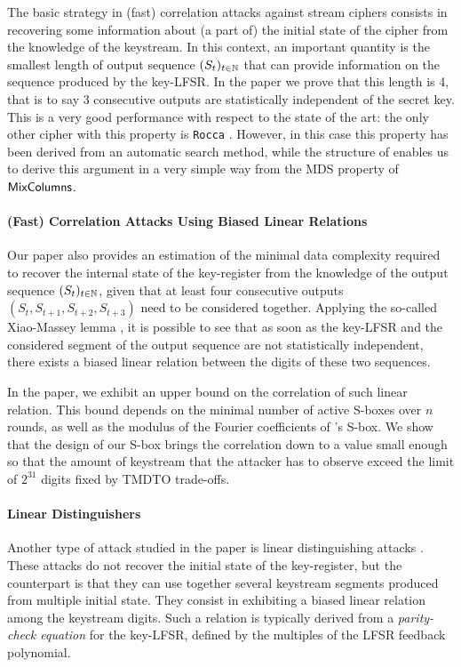 The basic strategy in (fast) correlation attacks against stream ciphers consists in recovering some information about (a part of) the initial state of the cipher from the knowledge of the keystream. 
In this context, an important quantity is the smallest length of output sequence $(S_t)_{t\in \mathbb{N}}$ that can provide information on the sequence produced by the key-LFSR. In the paper we prove that this length is 4, that is to say 3 consecutive outputs are statistically independent of the secret key. This is a very good performance with respect to the state of the art: the only other cipher with this property is \texttt{Rocca} \cite[Section 4.5]{ToSC:SLNKI21}. However, in this case this property has been derived from an automatic search method, while the structure of \coolName enables us to derive this argument in a very simple way from the MDS property of~$\text{\textsf{MixColumns}}$. 


\paragraph{(Fast) Correlation Attacks Using Biased Linear Relations}


Our paper also provides an estimation of the minimal data complexity required to recover the internal state of the key-register from the knowledge of the output sequence $(S_t)_{t\in \mathbb{N}}$, given that at least four consecutive outputs $(S_t, S_{t+1}, S_{t+2}, S_{t+3})$ need to be considered together. Applying the so-called Xiao-Massey lemma \cite{add:XiaMas88,add:Bry89}, it is possible to see that as soon as the key-LFSR and the considered segment of the output sequence are not statistically independent, there exists a biased linear relation between the digits of these two sequences.

In the paper, we exhibit an upper bound on the correlation of such linear relation. This bound depends on the minimal number of active \gls{S-box}es over $n$ rounds, as well as the modulus of the Fourier coefficients of \coolName's \gls{S-box}. We show that the design of our \gls{S-box} brings the correlation down to a value small enough so that the amount of keystream that the attacker has to observe exceed the limit of $2^{31}$ digits fixed by TMDTO trade-offs.


\paragraph{Linear Distinguishers}

Another type of attack studied in the paper is linear distinguishing attacks \cite{EC:MeiSta88,EC:CanTra00,FSE:CheJohSme00,C:TIMAZ18}. These attacks do not recover the initial state of the key-register, but the counterpart is that they can use together several keystream segments produced from multiple initial state. They consist in exhibiting a biased linear relation among the keystream digits. Such a relation is typically derived from a \textit{parity-check equation} for the key-LFSR, defined by the multiples of the LFSR feedback polynomial. 

